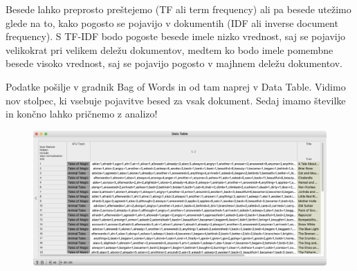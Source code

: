 Besede lahko preprosto preštejemo (TF ali term frequency) ali pa besede utežimo glede na to, kako pogosto se pojavijo v dokumentih (IDF ali inverse document frequency). S TF-IDF bodo pogoste besede imele nizko vrednost, saj se pojavijo velikokrat pri velikem deležu dokumentov, medtem ko bodo imele pomembne besede visoko vrednost, saj se pojavijo pogosto v majhnem deležu dokumentov.

Podatke pošilje v gradnik Bag of Words in od tam naprej v Data Table. Vidimo nov stolpec, ki vsebuje pojavitve besed za vsak dokument. Sedaj imamo številke in končno lahko pričnemo z analizo!

\begin{figure}[h]
    \includegraphics[width=\linewidth]{vreca-besed-table.png}%
    \caption{}
    \label{fig:004-vreca-besed-table}
  \end{figure}
